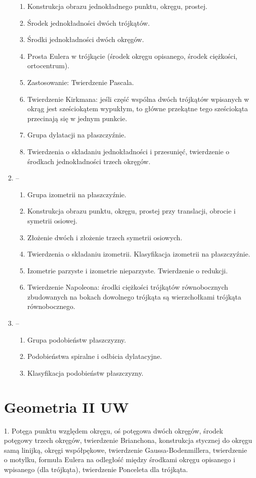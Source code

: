 \documentclass{parchment}
\begin{document}
\begin{enumerate}
\begin{enumerate}
		\item Konstrukcja obrazu jednokładnego punktu, okręgu, prostej.
		\item Środek jednokładności dwóch trójkątów.
		\item Środki jednokładności dwóch okręgów.
		\item Prosta Eulera w trójkącie (środek okręgu opisanego, środek ciężkości, ortocentrum).
		\item Zastosowanie: Twierdzenie Pascala.
		\item Twierdzenie Kirkmana: jeśli część wspólna dwóch trójkątów wpisanych w okrąg jest sześciokątem wypukłym, to główne przekątne tego sześciokąta przecinają się w jednym punkcie.
		\item Grupa dylatacji na płaszczyźnie.
		\item Twierdzenia o składaniu jednokładności i przesunięć, twierdzenie o środkach jednokładności trzech okręgów.
	\end{enumerate}
	\item -- \begin{enumerate}
		\item Grupa izometrii na płaszczyźnie.
		\item Konstrukcja obrazu punktu, okręgu, prostej przy translacji, obrocie i symetrii osiowej.
		\item Złożenie dwóch i złożenie trzech symetrii osiowych. 
		\item Twierdzenia o składaniu izometrii. Klasyfikacja izometrii na płaszczyźnie. 
		\item Izometrie parzyste i izometrie nieparzyste. Twierdzenie o redukcji.
		\item Twierdzenie Napoleona: środki ciężkości trójkątów równobocznych zbudowanych na bokach dowolnego trójkąta są wierzchołkami trójkąta równobocznego.
	\end{enumerate}
	\item -- \begin{enumerate}
		\item Grupa podobieństw płaszczyzny.
		\item Podobieństwa spiralne i odbicia dylatacyjne.
		\item Klasyfikacja podobieństw płaszczyzny.
	\end{enumerate}
\end{enumerate}

\section{Geometria II UW}
1. Potęga punktu względem okręgu, oś potęgowa dwóch okręgów, środek potęgowy trzech okręgów, twierdzenie Brianchona, konstrukcja stycznej do okręgu samą linijką, okręgi współpękowe, twierdzenie Gaussa-Bodenmillera, twierdzenie o motylku, formuła Eulera na odległość między środkami okręgu opisanego i wpisanego (dla trójkąta), twierdzenie Ponceleta dla trójkąta.
\end{document}
